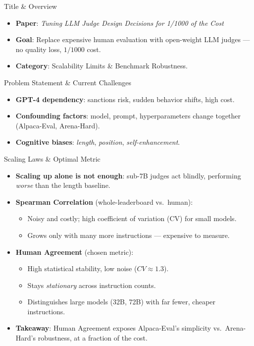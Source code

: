 \documentclass[10pt]{beamer}
\begin{document}
\begin{frame}{Title \& Overview}
  \begin{itemize}
    \item \textbf{Paper}: \emph{Tuning LLM Judge Design Decisions for 1/1000 of the Cost}
    \item \textbf{Goal}: Replace expensive human evaluation with open-weight LLM judges --- no quality loss, $1/1000$ cost.
    \item \textbf{Category}: Scalability Limits \& Benchmark Robustness.
  \end{itemize}
\end{frame}

\begin{frame}{Problem Statement \& Current Challenges}
  \begin{itemize}
    \item \textbf{GPT-4 dependency}: sanctions risk, sudden behavior shifts, high cost.
    \item \textbf{Confounding factors}: model, prompt, hyperparameters change together (Alpaca-Eval, Arena-Hard).
    \item \textbf{Cognitive biases}: \emph{length}, \emph{position}, \emph{self-enhancement}.
  \end{itemize}
\end{frame}

\begin{frame}{Scaling Laws \& Optimal Metric}
  \begin{itemize}
    \item \textbf{Scaling up alone is not enough}: sub-7B judges act blindly, performing \emph{worse} than the length baseline.
    \item \textbf{Spearman Correlation} (whole-leaderboard vs.\ human):
      \begin{itemize}
        \item Noisy and costly; high coefficient of variation (CV) for small models.
        \item Grows only with many more instructions --- expensive to measure.
      \end{itemize}
    \item \textbf{Human Agreement} (chosen metric):
      \begin{itemize}
        \item High statistical stability, low noise ($CV \approx 1.3$).
        \item Stays \emph{stationary} across instruction counts.
        \item Distinguishes large models (32B, 72B) with far fewer, cheaper instructions.
      \end{itemize}
    \item \textbf{Takeaway}: Human Agreement exposes Alpaca-Eval's simplicity vs.\ Arena-Hard's robustness, at a fraction of the cost.
  \end{itemize}
\end{frame}
\end{document}
